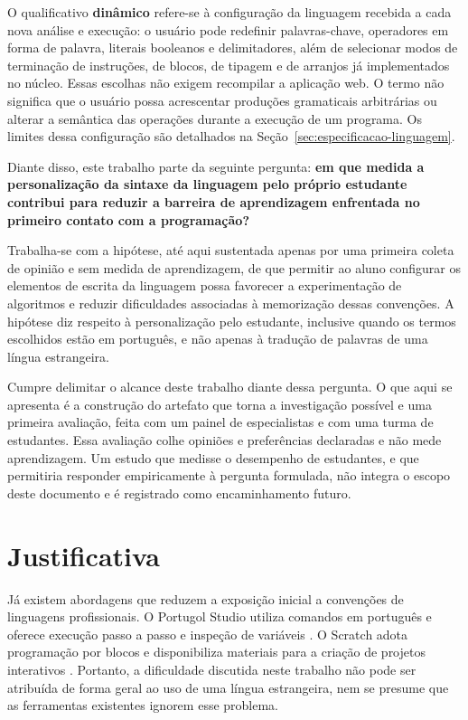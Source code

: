 O qualificativo \textbf{dinâmico} refere-se à configuração da linguagem recebida a cada nova análise e execução: o usuário pode redefinir palavras-chave, operadores em forma de palavra, literais booleanos e delimitadores, além de selecionar modos de terminação de instruções, de blocos, de tipagem e de arranjos já implementados no núcleo. Essas escolhas não exigem recompilar a aplicação web. O termo não significa que o usuário possa acrescentar produções gramaticais arbitrárias ou alterar a semântica das operações durante a execução de um programa. Os limites dessa configuração são detalhados na Seção~\ref{sec:especificacao-linguagem}.

Diante disso, este trabalho parte da seguinte pergunta: \textbf{em que medida a personalização da sintaxe da linguagem pelo próprio estudante contribui para reduzir a barreira de aprendizagem enfrentada no primeiro contato com a programação?}

Trabalha-se com a hipótese, até aqui sustentada apenas por uma primeira coleta de opinião e sem medida de aprendizagem, de que permitir ao aluno configurar os elementos de escrita da linguagem possa favorecer a experimentação de algoritmos e reduzir dificuldades associadas à memorização dessas convenções. A hipótese diz respeito à personalização pelo estudante, inclusive quando os termos escolhidos estão em português, e não apenas à tradução de palavras de uma língua estrangeira.

Cumpre delimitar o alcance deste trabalho diante dessa pergunta. O que aqui se apresenta é a construção do artefato que torna a investigação possível e uma primeira avaliação, feita com um painel de especialistas e com uma turma de estudantes. Essa avaliação colhe opiniões e preferências declaradas e não mede aprendizagem. Um estudo que medisse o desempenho de estudantes, e que permitiria responder empiricamente à pergunta formulada, não integra o escopo deste documento e é registrado como encaminhamento futuro.

\section{Justificativa}

Já existem abordagens que reduzem a exposição inicial a convenções de linguagens profissionais. O Portugol Studio utiliza comandos em português e oferece execução passo a passo e inspeção de variáveis \cite{univali2026}. O Scratch adota programação por blocos e disponibiliza materiais para a criação de projetos interativos \cite{scratch2026}. Portanto, a dificuldade discutida neste trabalho não pode ser atribuída de forma geral ao uso de uma língua estrangeira, nem se presume que as ferramentas existentes ignorem esse problema.

